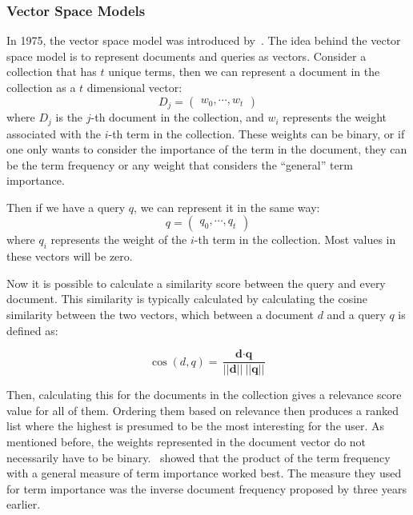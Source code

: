\subsubsection{Vector Space Models}
In 1975, the vector space model was introduced by~\citet{VectorSpaceModel}. The idea behind the vector space model is to represent documents and queries as vectors. Consider a collection that has $t$ unique terms, then we can represent a document in the collection as a $t$ dimensional vector:
\begin{equation}
	D_j = \begin{pmatrix}
		w_0, \cdots, w_t
	\end{pmatrix}
\end{equation}
where $D_j$ is the $j$-th document in the collection, and $w_i$ represents the weight associated with the $i$-th term in the collection. These weights can be binary, or if one only wants to consider the importance of the term in the document, they can be the term frequency or any weight that considers the ``general'' term importance. 

Then if we have a query $q$, we can represent it in the same way:
\begin{equation}
	q = \begin{pmatrix}
		q_0, \cdots, q_t
	\end{pmatrix}
\end{equation}
where $q_i$ represents the weight of the $i$-th term in the collection. Most values in these vectors will be zero.

Now it is possible to calculate a similarity score between the query and every document. This similarity is typically calculated by calculating the cosine similarity between the two vectors, which between a document $d$ and a query $q$ is defined as:

\begin{equation}
	\cos\left(d, q\right) = \frac{\textbf{d} \cdot \textbf{q}}{||\textbf{d}||\ ||\textbf{q}||}
\end{equation}

Then, calculating this for the documents in the collection gives a relevance score value for all of them. Ordering them based on relevance then produces a ranked list where the highest is presumed to be the most interesting for the user. As mentioned before, the weights represented in the document vector do not necessarily have to be binary. ~showed that the product of the term frequency with a general measure of term importance worked best. The measure they used for term importance was the inverse document frequency proposed by \citet{idf} three years earlier.


